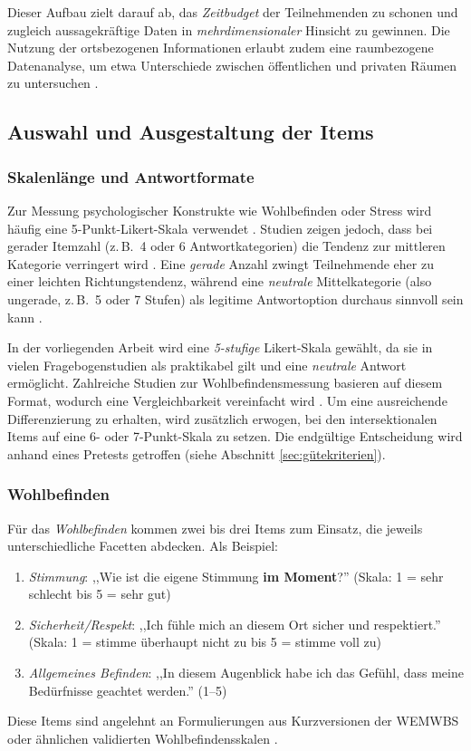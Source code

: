 Dieser Aufbau zielt darauf ab, das \emph{Zeitbudget} der Teilnehmenden zu schonen und zugleich aussagekräftige Daten in \emph{mehrdimensionaler} Hinsicht zu gewinnen. Die Nutzung der ortsbezogenen Informationen erlaubt zudem eine raumbezogene Datenanalyse, um etwa Unterschiede zwischen öffentlichen und privaten Räumen zu untersuchen \parencite{bakolis_urban_2018, rodo-de-zarate_developing_2014}.

\subsection{Auswahl und Ausgestaltung der Items}
\subsubsection{Skalenlänge und Antwortformate}
Zur Messung psychologischer Konstrukte wie Wohlbefinden oder Stress wird häufig eine 5-Punkt-Likert-Skala verwendet \parencite{likert_technique_1932}. Studien zeigen jedoch, dass bei gerader Itemzahl (z.\,B.\ 4 oder 6 Antwortkategorien) die Tendenz zur mittleren Kategorie verringert wird \parencite{bradburn_asking_2004}. Eine \emph{gerade} Anzahl zwingt Teilnehmende eher zu einer leichten Richtungstendenz, während eine \emph{neutrale} Mittelkategorie (also ungerade, z.\,B.\ 5 oder 7 Stufen) als legitime Antwortoption durchaus sinnvoll sein kann \parencite{krosnick_question_2009}.

In der vorliegenden Arbeit wird eine \emph{5-stufige} Likert-Skala gewählt, da sie in vielen Fragebogenstudien als praktikabel gilt und eine \emph{neutrale} Antwort ermöglicht. Zahlreiche Studien zur Wohlbefindensmessung basieren auf diesem Format, wodurch eine Vergleichbarkeit vereinfacht wird \parencite{tennant_warwick-edinburgh_2007}. Um eine ausreichende Differenzierung zu erhalten, wird zusätzlich erwogen, bei den intersektionalen Items auf eine 6- oder 7-Punkt-Skala zu setzen. Die endgültige Entscheidung wird anhand eines Pretests getroffen (siehe Abschnitt \ref{sec:gütekriterien}).

\subsubsection{Wohlbefinden}
Für das \emph{Wohlbefinden} kommen zwei bis drei Items zum Einsatz, die jeweils unterschiedliche Facetten abdecken. Als Beispiel:
\begin{enumerate}[label=\emph{(WB\arabic*)}]
  \item \emph{Stimmung}: ,,Wie ist die eigene Stimmung \textbf{im Moment}?'' (Skala: 1 = sehr schlecht bis 5 = sehr gut)
  \item \emph{Sicherheit/Respekt}: ,,Ich fühle mich an diesem Ort sicher und respektiert.'' (Skala: 1 = stimme überhaupt nicht zu bis 5 = stimme voll zu)
  \item \emph{Allgemeines Befinden}: ,,In diesem Augenblick habe ich das Gefühl, dass meine Bedürfnisse geachtet werden.'' (1--5)
\end{enumerate}
Diese Items sind angelehnt an Formulierungen aus Kurzversionen der WEMWBS oder ähnlichen validierten Wohlbefindensskalen \parencite{tennant_warwick-edinburgh_2007}.

